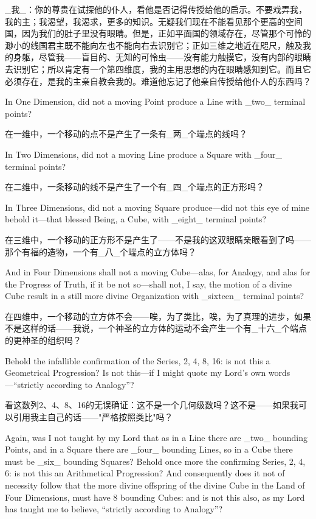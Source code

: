 \documentclass[12pt,UTF8]{ctexbook}
\begin{document}
\_我\_：你的尊贵在试探他的仆人，看他是否记得传授给他的启示。不要戏弄我，我的主；我渴望，我渴求，更多的知识。无疑我们现在不能看见那个更高的空间国，因为我们的肚子里没有眼睛。但是，正如平面国的领域存在，尽管那个可怜的渺小的线国君主既不能向左也不能向右去识别它；正如三维之地近在咫尺，触及我的身躯，尽管我——盲目的、无知的可怜虫——没有能力触摸它，没有内部的眼睛去识别它；所以肯定有一个第四维度，我的主用思想的内在眼睛感知到它。而且它必须存在，是我的主亲自教会我的。难道他忘记了他亲自传授给他仆人的东西吗？

In One Dimension, did not a moving Point produce a Line with \_two\_ terminal points?

在一维中，一个移动的点不是产生了一条有\_两\_个端点的线吗？

In Two Dimensions, did not a moving Line produce a Square with \_four\_ terminal points?

在二维中，一条移动的线不是产生了一个有\_四\_个端点的正方形吗？

In Three Dimensions, did not a moving Square produce---did not this eye of mine behold it---that blessed Being, a Cube, with \_eight\_ terminal points?

在三维中，一个移动的正方形不是产生了——不是我的这双眼睛亲眼看到了吗——那个有福的造物，一个有\_八\_个端点的立方体吗？

And in Four Dimensions shall not a moving Cube---alas, for Analogy, and alas for the Progress of Truth, if it be not so---shall not, I say, the motion of a divine Cube result in a still more divine Organization with \_sixteen\_ terminal points?

在四维中，一个移动的立方体不会——唉，为了类比，唉，为了真理的进步，如果不是这样的话——我说，一个神圣的立方体的运动不会产生一个有\_十六\_个端点的更神圣的组织吗？

Behold the infallible confirmation of the Series, 2, 4, 8, 16: is not this a Geometrical Progression? Is not this---if I might quote my Lord's own words---``strictly according to Analogy''?

看这数列2、4、8、16的无误确证：这不是一个几何级数吗？这不是——如果我可以引用我主自己的话——"严格按照类比"吗？

Again, was I not taught by my Lord that as in a Line there are \_two\_ bounding Points, and in a Square there are \_four\_ bounding Lines, so in a Cube there must be \_six\_ bounding Squares? Behold once more the confirming Series, 2, 4, 6: is not this an Arithmetical Progression? And consequently does it not of necessity follow that the more divine offspring of the divine Cube in the Land of Four Dimensions, must have 8 bounding Cubes: and is not this also, as my Lord has taught me to believe, ``strictly according to Analogy''?
\end{document}
